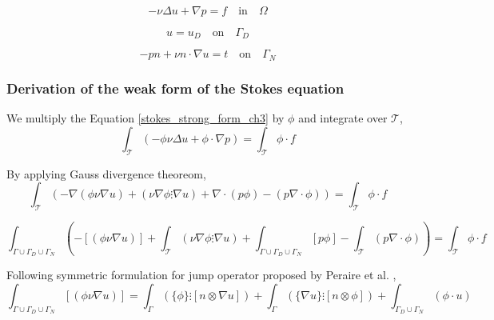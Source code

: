 \documentclass[a4paper]{book}
\begin{document}
\begin{equation} \label{stokes_strong_form_ch3}
-\nu \Delta u + \nabla p = f \quad \textrm{in} \quad \Omega
\end{equation}

\begin{equation} \label{dirichlet condition stokes_ch3}
u = u_D \quad \textrm{on} \quad \Gamma_D
\end{equation}

\begin{equation} \label{neumann condition stokes_ch3}
-pn + \nu n \cdot \nabla u = t \quad \textrm{on} \quad \Gamma_N
\end{equation}


\subsubsection{Derivation of the weak form of the Stokes equation} \label{derivation_weak_stokes}

We multiply the Equation \ref{stokes_strong_form_ch3} by $\phi$ and integrate over $\mathcal{T}$,
\begin{equation}
\int_{\mathcal{T}} (- \phi \nu \Delta u + \phi \cdot \nabla p) = \int_{\mathcal{T}} \phi \cdot f 
\end{equation}

By applying Gauss divergence theoreom,
\begin{equation}
\int_{\mathcal{T}} (-\nabla (\phi \nu \nabla u) + (\nu \nabla \phi \vdots \nabla u) + \nabla \cdot (p \phi) - (p \nabla \cdot \phi)) = \int_{\mathcal{T}} \phi \cdot f 
\end{equation}

\begin{equation}
\int_{\Gamma \cup \Gamma_D \cup \Gamma_N} (- [(\phi \nu \nabla u)] + \int_{\mathcal{T}}  (\nu \nabla \phi \vdots \nabla u) + \int_{\Gamma \cup \Gamma_D \cup \Gamma_N}  [p \phi] - \int_{\mathcal{T}}  (p \nabla \cdot \phi)) = \int_{\mathcal{T}} \phi \cdot f 
\end{equation}

Following symmetric formulation for jump operator proposed by Peraire et al. \cite{peraire},
\begin{equation}
\int_{\Gamma \cup \Gamma_D \cup \Gamma_N} [(\phi \nu \nabla u)] = \int_{\Gamma} (\lbrace \phi \rbrace \vdots [n \otimes \nabla u]) + \int_{\Gamma} (\lbrace \nabla u \rbrace \vdots [n \otimes \phi]) + \int_{\Gamma_D \cup \Gamma_N} (\phi \cdot u ) 
\end{equation}
\end{document}
